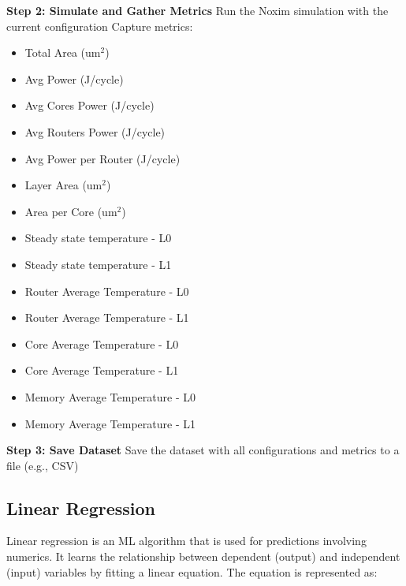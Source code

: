 \documentclass[conference]{IEEEtran}
\begin{document}
\begin{algorithm}[h]
\begin{algorithmic}[1]
    \State \textbf{Step 2: Simulate and Gather Metrics}
        \State Run the Noxim simulation with the current configuration
        \State Capture metrics:
            \begin{itemize}
                \item Total Area (um\(^2\))
                \item Avg Power (J/cycle)
                \item Avg Cores Power (J/cycle)
                \item Avg Routers Power (J/cycle)
                \item Avg Power per Router (J/cycle)
                \item Layer Area (um\(^2\))
                \item Area per Core (um\(^2\))
                \item Steady state temperature - L0
                \item Steady state temperature - L1
                \item Router Average Temperature - L0
                \item Router Average Temperature - L1
                \item Core Average Temperature - L0
                \item Core Average Temperature - L1
                \item Memory Average Temperature - L0
                \item Memory Average Temperature - L1
            \end{itemize}
    \EndFor
    
    \State \textbf{Step 3: Save Dataset}
    \State Save the dataset with all configurations and metrics to a file (e.g., CSV)
    
\end{algorithmic}
\end{algorithm}



\subsection{Linear Regression}

Linear regression is an ML algorithm that is used for predictions involving numerics. It learns the relationship between dependent (output) and independent (input) variables by fitting a linear equation. The equation is represented as:
\end{document}
